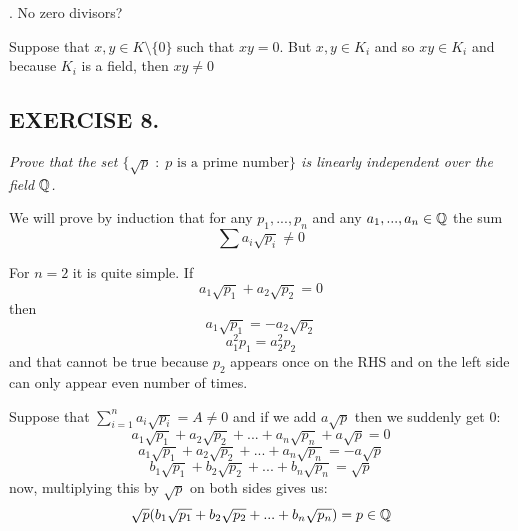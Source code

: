 \documentclass{article}
\begin{document}
. No zero divisors?

Suppose that $x,y\in K\setminus\{0\}$ such that $xy=0$. But $x,y\in K_i$ and so $xy\in K_i$ and because $K_i$ is a field, then $xy\neq 0$

\subsection*{EXERCISE 8.}
\emph{\color{pink}Prove that the set $\{\sqrt{p}\;:\;p\text{ is a prime number}\}$ is linearly independent over the field $\mathbb{Q}$.}
\smallskip

We will prove by induction that for any $p_1,...,p_n$ and any $a_1,...,a_n\in\mathbb{Q}$ the sum
$$\sum a_i\sqrt{p_i}\neq0$$

For $n=2$ it is quite simple. If
$$a_1\sqrt{p_1}+a_2\sqrt{p_2}=0$$
then
$$a_1\sqrt{p_1}=-a_2\sqrt{p_2}$$
$$a_1^2p_1=a_2^2p_2$$
and that cannot be true because $p_2$ appears once on the RHS and on the left side can only appear even number of times.

Suppose that $\sum\limits_{i=1}^{n}a_i\sqrt{p_i}=A\neq 0$ and if we add $a\sqrt{p}$ then we suddenly get $0$:
$$a_1\sqrt{p_1}+a_2\sqrt{p_2}+...+a_n\sqrt{p_n}+a\sqrt{p}=0$$
$$a_1\sqrt{p_1}+a_2\sqrt{p_2}+...+a_{n}\sqrt{p_n}=-a\sqrt{p}$$
$$b_1\sqrt{p_1}+b_2\sqrt{p_2}+...+b_n\sqrt{p_n}=\sqrt{p}$$
now, multiplying this by $\sqrt{p}$ on both sides gives us:
$$\sqrt{p}(b_1\sqrt{p_1}+b_2\sqrt{p_2}+...+b_n\sqrt{p_n})=p\in\mathbb{Q}$$
\end{document}
